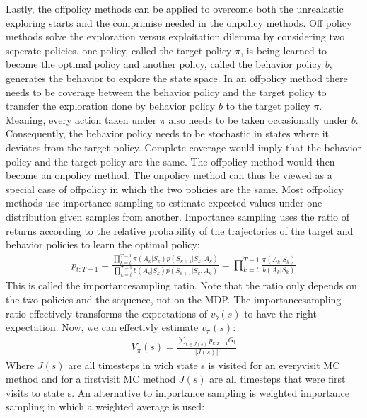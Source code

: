 \documentclass[letterpaper,10pt,english]{jupyterBook}
\begin{document}
\sphinxAtStartPar
Lastly, the off\sphinxhyphen{}policy methods can be applied to overcome both the unrealastic exploring starts and the comprimise needed in the on\sphinxhyphen{}policy methods. Off policy methods solve the exploration versus exploitation dilemma by considering two seperate policies. one policy, called the target policy \(\pi\), is being learned to become the optimal policy and another policy, called the behavior policy \(b\), generates the behavior to explore the state space. In an off\sphinxhyphen{}policy method there needs to be coverage between the behavior policy and the target policy to transfer the exploration done by behavior policy \(b\) to the target policy \(\pi\). Meaning, every action taken under \(\pi\) also needs to be taken occasionally under \(b\). Consequently, the behavior policy needs to be stochastic in states where it deviates from the target policy. Complete coverage would imply that the behavior policy and the target policy are the same. The off\sphinxhyphen{}policy method would then become an on\sphinxhyphen{}policy method. The on\sphinxhyphen{}policy method can thus be viewed as a special case of off\sphinxhyphen{}policy in which the two policies are the same. Most off\sphinxhyphen{}policy methods use importance sampling to estimate expected values under one distribution given samples from another. Importance sampling uses the ratio of returns according to the relative probability of the trajectories of the target and behavior policies to learn the optimal policy:
\begin{equation*}
\begin{split} p_{t:T-1} = \frac{\prod^{T-1}_{k=t} \pi(A_k|S_k)p(S_{k+1}|S_k, A_k)}{\prod_{k=t}^{T-1}b(A_k|S_k)p(S_{k+1}|S_k,A_k)} = \prod_{k=t}^{T-1}\frac{\pi(A_k|S_k)}{b(A_k|S_k)}\end{split}
\end{equation*}
\sphinxAtStartPar
This is called the importance\sphinxhyphen{}sampling ratio. Note that the ratio only depends on the two policies and the sequence, not on the MDP. The importance\sphinxhyphen{}sampling ratio effectively transforms the expectations of \(v_b(s)\) to have the right expectation.  Now, we can effectivly estimate \(v_{\pi}(s)\):
\begin{equation*}
\begin{split}V_{\pi}(s) = \frac{\sum_{t\in J(s)} p_{t:T-1}G_t}{|J(s)|}\end{split}
\end{equation*}
\sphinxAtStartPar
Where \(J(s)\) are all timesteps in wich state s is visited for an every\sphinxhyphen{}visit MC method and for a first\sphinxhyphen{}visit MC method \(J(s)\) are all timesteps that were first visits to state s. An alternative to importance sampling is weighted importance sampling in which a weighted average is used:
\end{document}
